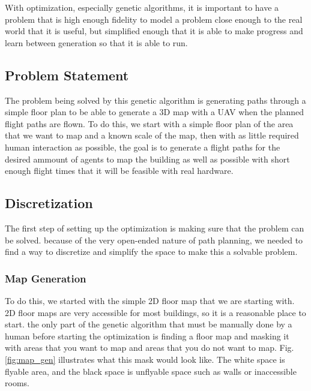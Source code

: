 \documentclass[letterpaper, 10 pt, conference]{ieeeconf}  %
\begin{document}
With optimization, especially genetic algorithms, it is important to have a problem that is high enough fidelity to model a problem close enough to the real world that it is useful, but simplified enough that it is able to make progress and learn between generation so that it is able to run.

\subsection{Problem Statement}

The problem being solved by this genetic algorithm is generating paths through a simple floor plan to be able to generate a 3D map with a UAV when the planned flight paths are flown. To do this, we start with a simple floor plan of the area that we want to map and a known scale of the map, then with as little required human interaction as possible, the goal is to generate a flight paths for the desired ammount of agents to map the building as well as possible with short enough flight times that it will be feasible with real hardware.

\subsection{Discretization}

The first step of setting up the optimization is making sure that the problem can be solved. because of the very open-ended nature of path planning, we needed to find a way to discretize and simplify the space to make this a solvable problem.

\subsubsection{Map Generation}

To do this, we started with the simple 2D floor map that we are starting with. 2D floor maps are very accessible for most buildings, so it is a reasonable place to start. the only part of the genetic algorithm that must be manually done by a human before starting the optimization is finding a floor map and masking it with areas that you want to map and areas that you do not want to map. Fig. \ref{fig:map_gen} illustrates what this mask would look like. The white space is flyable area, and the black space is unflyable space such as walls or inaccessible rooms.
\end{document}
